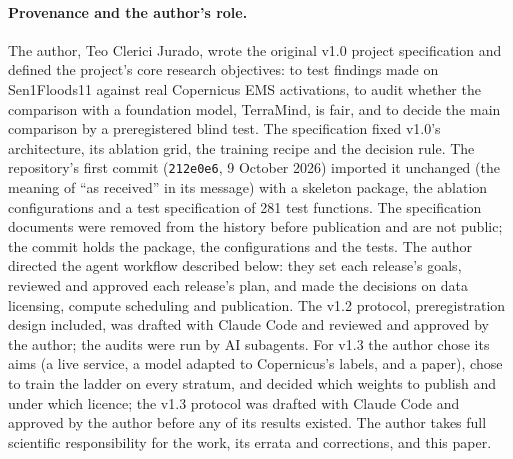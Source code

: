 \documentclass[10pt,twocolumn,a4paper]{article}
\begin{document}
\paragraph{Provenance and the author's role.} The author, Teo Clerici Jurado, wrote the original v1.0 project
specification and defined the project's core research objectives: to test findings made on Sen1Floods11 against real
Copernicus EMS activations, to audit whether the comparison with a foundation model, TerraMind, is fair, and to decide
the main comparison by a preregistered blind test. The specification fixed v1.0's architecture, its ablation grid,
the training recipe and the decision rule. The repository's first commit (\texttt{212e0e6}, 9 October 2026) imported
it unchanged (the meaning of ``as received'' in its message) with a skeleton package, the ablation configurations and a test
specification of 281 test functions. The specification documents were removed from the history before publication
and are not public; the commit holds the package, the configurations and the tests. The author directed the agent
workflow described below: they set each release's goals, reviewed and approved each release's plan, and made the
decisions on data licensing, compute scheduling and publication. The v1.2 protocol, preregistration design included,
was drafted with Claude Code and reviewed and approved by the author; the audits were run by AI subagents. For v1.3
the author chose its aims (a live service, a model adapted to Copernicus's labels, and a paper), chose to train the
ladder on every stratum, and decided which weights to publish and under which licence; the v1.3 protocol was drafted
with Claude Code and approved by the author before any of its results existed. The author takes full scientific
responsibility for the work, its errata and corrections, and this paper.
\end{document}
